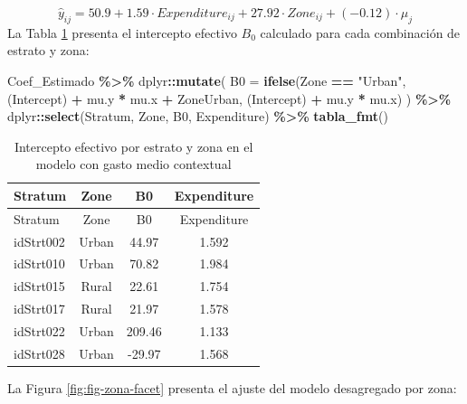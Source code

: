 \documentclass[
  spanish,
  12pt,
]{book}
\newenvironment{Shaded}{\begin{snugshade}}{\end{snugshade}}
\newcommand{\AttributeTok}[1]{\textcolor[rgb]{0.13,0.29,0.53}{#1}}
\newcommand{\FunctionTok}[1]{\textcolor[rgb]{0.13,0.29,0.53}{\textbf{#1}}}
\newcommand{\NormalTok}[1]{#1}
\newcommand{\SpecialCharTok}[1]{\textcolor[rgb]{0.81,0.36,0.00}{\textbf{#1}}}
\newcommand{\StringTok}[1]{\textcolor[rgb]{0.31,0.60,0.02}{#1}}
\begin{document}
\[
\hat{y}_{ij} = 50.9 + 1.59 \cdot Expenditure_{ij} + 27.92 \cdot Zone_{ij} + (-0.12) \cdot \mu_j
\]
La Tabla \ref{tab:tab-b0-calculado} presenta el intercepto efectivo \(B_0\) calculado para cada combinación de estrato y zona:

\begin{Shaded}
\begin{Highlighting}[]
\NormalTok{Coef\_Estimado }\SpecialCharTok{\%\textgreater{}\%}
\NormalTok{  dplyr}\SpecialCharTok{::}\FunctionTok{mutate}\NormalTok{(}
    \AttributeTok{B0 =} \FunctionTok{ifelse}\NormalTok{(Zone }\SpecialCharTok{==} \StringTok{"Urban"}\NormalTok{,}
                \StringTok{\textasciigrave{}}\AttributeTok{(Intercept)}\StringTok{\textasciigrave{}} \SpecialCharTok{+}\NormalTok{ mu.y }\SpecialCharTok{*}\NormalTok{ mu.x }\SpecialCharTok{+}\NormalTok{ ZoneUrban,}
                \StringTok{\textasciigrave{}}\AttributeTok{(Intercept)}\StringTok{\textasciigrave{}} \SpecialCharTok{+}\NormalTok{ mu.y }\SpecialCharTok{*}\NormalTok{ mu.x)}
\NormalTok{  ) }\SpecialCharTok{\%\textgreater{}\%}
\NormalTok{  dplyr}\SpecialCharTok{::}\FunctionTok{select}\NormalTok{(Stratum, Zone, B0, Expenditure) }\SpecialCharTok{\%\textgreater{}\%}
  \FunctionTok{tabla\_fmt}\NormalTok{()}
\end{Highlighting}
\end{Shaded}

\begin{longtable}[]{@{}lccc@{}}
\caption{\label{tab:tab-b0-calculado}Intercepto efectivo por estrato y zona en el modelo con gasto medio contextual}\tabularnewline
\toprule\noalign{}
Stratum & Zone & B0 & Expenditure \\
\midrule\noalign{}
\endfirsthead
\toprule\noalign{}
Stratum & Zone & B0 & Expenditure \\
\midrule\noalign{}
\endhead
\bottomrule\noalign{}
\endlastfoot
idStrt002 & Urban & 44.97 & 1.592 \\
idStrt010 & Urban & 70.82 & 1.984 \\
idStrt015 & Rural & 22.61 & 1.754 \\
idStrt017 & Rural & 21.97 & 1.578 \\
idStrt022 & Urban & 209.46 & 1.133 \\
idStrt028 & Urban & -29.97 & 1.568 \\
\end{longtable}

La Figura \ref{fig:fig-zona-facet} presenta el ajuste del modelo desagregado por zona:
\end{document}
